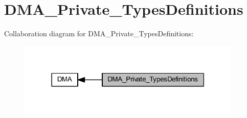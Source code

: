 \hypertarget{group___d_m_a___private___types_definitions}{}\section{D\+M\+A\+\_\+\+Private\+\_\+\+Types\+Definitions}
\label{group___d_m_a___private___types_definitions}
Collaboration diagram for D\+M\+A\+\_\+\+Private\+\_\+\+Types\+Definitions\+:
\nopagebreak
\begin{figure}[H]
\begin{center}
\leavevmode
\includegraphics[width=303pt]{group___d_m_a___private___types_definitions}
\end{center}
\end{figure}
